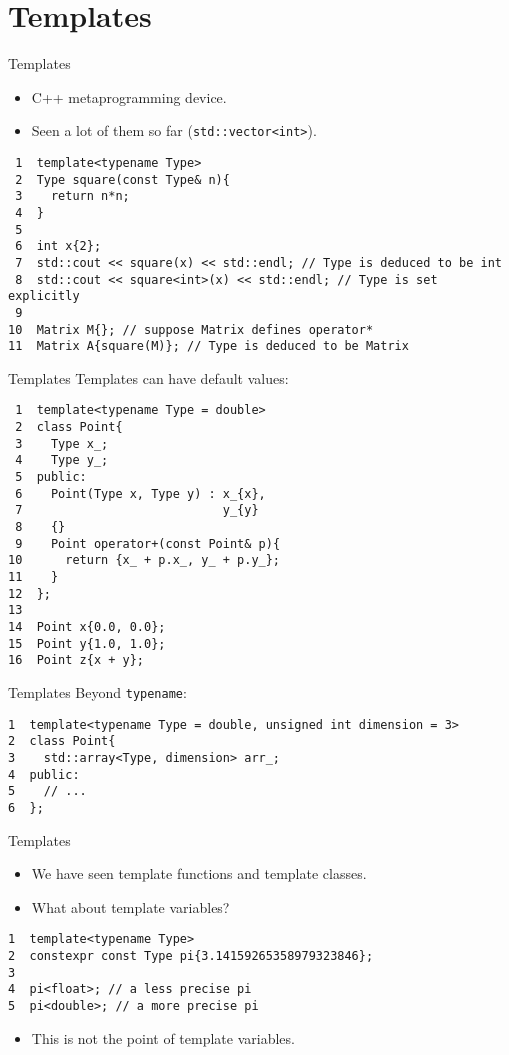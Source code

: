 \documentclass[presentation]{beamer}
\begin{document}
\section{Templates}
\label{sec:org59adffd}
\begin{frame}[label={sec:org5867542},fragile]{Templates}
 \begin{itemize}
\item C++ metaprogramming device.
\item Seen a lot of them so far (\texttt{std::vector<int>}).
\end{itemize}

\begin{verbatim}
 1  template<typename Type>
 2  Type square(const Type& n){
 3    return n*n;
 4  }
 5  
 6  int x{2};
 7  std::cout << square(x) << std::endl; // Type is deduced to be int
 8  std::cout << square<int>(x) << std::endl; // Type is set explicitly
 9  
10  Matrix M{}; // suppose Matrix defines operator*
11  Matrix A{square(M)}; // Type is deduced to be Matrix
\end{verbatim}
\end{frame}
\begin{frame}[label={sec:orgcef9576},fragile]{Templates}
 Templates can have default values:
\begin{verbatim}
 1  template<typename Type = double>
 2  class Point{
 3    Type x_;
 4    Type y_;
 5  public:
 6    Point(Type x, Type y) : x_{x},
 7                            y_{y}
 8    {}
 9    Point operator+(const Point& p){
10      return {x_ + p.x_, y_ + p.y_};
11    }
12  };
13  
14  Point x{0.0, 0.0};
15  Point y{1.0, 1.0};
16  Point z{x + y};
\end{verbatim}
\end{frame}
\begin{frame}[label={sec:org74fcaff},fragile]{Templates}
 Beyond \texttt{typename}:
\begin{verbatim}
1  template<typename Type = double, unsigned int dimension = 3>
2  class Point{
3    std::array<Type, dimension> arr_;
4  public:
5    // ...
6  };
\end{verbatim}
\end{frame}
\begin{frame}[label={sec:org8880807},fragile]{Templates}
 \begin{itemize}
\item We have seen template functions and template classes.
\item What about template variables?
\end{itemize}
\begin{verbatim}
1  template<typename Type>
2  constexpr const Type pi{3.14159265358979323846};
3  
4  pi<float>; // a less precise pi
5  pi<double>; // a more precise pi
\end{verbatim}
\begin{itemize}
\item This is not the point of template variables.
\end{itemize}
\end{frame}
\end{document}
